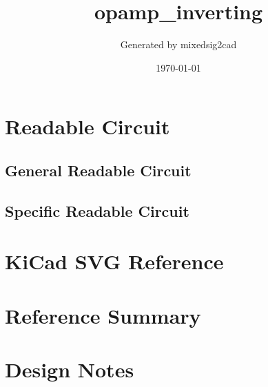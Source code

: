 \documentclass[11pt]{article}
\title{opamp\_inverting}
\author{Generated by mixedsig2cad}
\date{\today}
\begin{document}
\maketitle
\section{Readable Circuit}
\subsection{General Readable Circuit}

\subsection{Specific Readable Circuit}

\section{KiCad SVG Reference}
\section{Reference Summary}

\section{Design Notes}

\end{document}
